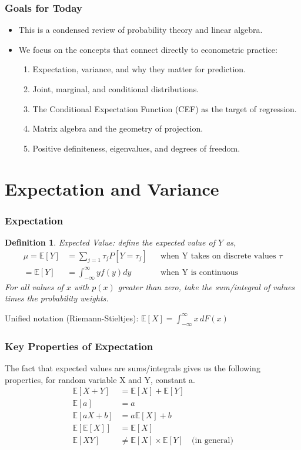 \documentclass[aspectratio=169, handout, t]{beamer}
\newtheorem{defn}{Definition}
\numberwithin{equation}{section}
\begin{document}
\begin{frame}
\frametitle{Goals for Today}
\begin{itemize}
\item This is a condensed review of probability theory and linear algebra.
\item We focus on the concepts that connect directly to econometric practice:
\begin{enumerate}
\item Expectation, variance, and why they matter for prediction.
\item Joint, marginal, and conditional distributions.
\item The Conditional Expectation Function (CEF) as the target of regression.
\item Matrix algebra and the geometry of projection.
\item Positive definiteness, eigenvalues, and degrees of freedom.
\end{enumerate}
\end{itemize}
\end{frame}


\section[E and Var]{Expectation and Variance}

\begin{frame}
\frametitle{Expectation}

\begin{defn}
Expected Value: define the expected value of $Y$ as,
\begin{align*}
\mu=\mathbb{E}[Y] &=  \sum_{j=1} \tau_j P[Y=\tau_j] &&\text{when Y takes on discrete values $\tau$} \\
=\mathbb{E}[Y] &=  \int_{-\infty}^{\infty} y f(y) dy &&\text{when Y is continuous}
\end{align*}
For all values of $x$ with $p(x)$ greater than zero, take the sum/integral of values times the probability weights.
\end{defn}
Unified notation (Riemann-Stieltjes): $\mathbb{E}[X]=\int_{-\infty}^{\infty} x \, dF(x)$
\end{frame}


\begin{frame}
\frametitle{Key Properties of Expectation}
The fact that expected values are sums/integrals gives us the following properties, for random variable X and Y, constant a.
\begin{align*}
\mathbb{E}[X+Y]&=\mathbb{E}[X]+\mathbb{E}[Y]\\[6pt]
\mathbb{E}[a]&=a\\[6pt]
\mathbb{E}[aX+b]&=a\mathbb{E}[X]+b\\[6pt]
\mathbb{E}[\mathbb{E}[X]]&=\mathbb{E}[X]\\[6pt]
\mathbb{E}[XY]&\neq \mathbb{E}[X]\times \mathbb{E}[Y] \quad \text{(in general)}
\end{align*}
\end{frame}
\end{document}
